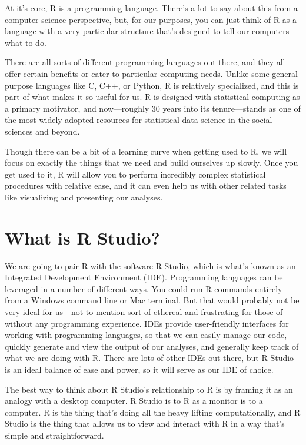 \documentclass[
  letterpaper,
  DIV=11,
  numbers=noendperiod]{scrreprt}
\begin{document}
At it's core, R is a programming language. There's a lot to say about
this from a computer science perspective, but, for our purposes, you can
just think of R as a language with a very particular structure that's
designed to tell our computers what to do.

There are all sorts of different programming languages out there, and
they all offer certain benefits or cater to particular computing needs.
Unlike some general purpose languages like C, C++, or Python, R is
relatively specialized, and this is part of what makes it so useful for
us. R is designed with statistical computing as a primary motivator, and
now---roughly 30 years into its tenure---stands as one of the most
widely adopted resources for statistical data science in the social
sciences and beyond.

Though there can be a bit of a learning curve when getting used to R, we
will focus on exactly the things that we need and build ourselves up
slowly. Once you get used to it, R will allow you to perform incredibly
complex statistical procedures with relative ease, and it can even help
us with other related tasks like visualizing and presenting our
analyses.

\section{What is R Studio?}\label{what-is-r-studio}

We are going to pair R with the software R Studio, which is what's known
as an Integrated Development Environment (IDE). Programming languages
can be leveraged in a number of different ways. You could run R commands
entirely from a Windows command line or Mac terminal. But that would
probably not be very ideal for us---not to mention sort of ethereal and
frustrating for those of without any programming experience. IDEs
provide user-friendly interfaces for working with programming languages,
so that we can easily manage our code, quickly generate and view the
output of our analyses, and generally keep track of what we are doing
with R. There are lots of other IDEs out there, but R Studio is an ideal
balance of ease and power, so it will serve as our IDE of choice.

The best way to think about R Studio's relationship to R is by framing
it as an analogy with a desktop computer. R Studio is to R as a monitor
is to a computer. R is the thing that's doing all the heavy lifting
computationally, and R Studio is the thing that allows us to view and
interact with R in a way that's simple and straightforward.
\end{document}
